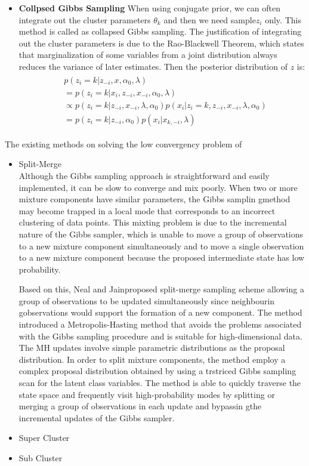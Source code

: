 \begin{itemize}
\begin{eqnarray}
\begin{split}
		 \end{split}
	 \end{eqnarray}
	 \item \textbf{Collpsed Gibbs Sampling}
	 When using conjugate prior, we can often integrate out the cluster parameters $\theta_k$ and then we need sample$z_i$ only. This method is called as collapsed Gibbs sampling. The justification of integrating out the cluster parameters is due to the Rao-Blackwell Theorem, which states that marginalization of some variables from a joint distribution always reduces the variance of later estimates. Then the posterior distribution of $z$ is:
	  \begin{eqnarray}
		  \begin{split}
			  &	p(z_i=k|z_{-i},x,\alpha_0,\lambda)  \\
			  & = p(z_i=k|x_i,z_{-i},x_{-i},\alpha_0,\lambda) \\
			  & \propto  p(z_i=k|z_{-i},x_{-i},\lambda,\alpha_0)p(x_i|z_i=k,z_{-i},x_{-i},\lambda,\alpha_0)  \\
			  & =p(z_i=k|z_{-i},\alpha_0)p(x_i|x_{k,-i},\lambda) 
		  \end{split}
	  \end{eqnarray}
	 \end{itemize}
	 The existing methods on solving the low convergency problem of 
	 \begin{itemize}
	 	\item Split-Merge \\
	 	Although the Gibbs sampling approach is straightforward and easily implemented, it can be slow to converge and mix poorly. When two or more mixture components have similar parameters, the Gibbs samplin gmethod may become trapped in a local mode that corresponds to an incorrect clustering of data points. This mixting problem is due to the incremental nature of the Gibbs sampler, which is unable to move a group of observations to a new mixture component simultaneously and to move a single observation to a new mixture component because the proposed intermediate state has low probability. 
	 	
	 	Based on this, Neal and Jain\cite{jain2004split}proposed split-merge sampling scheme allowing a group of observations to be updated simultaneously since neighbourin gobservations would support the formation of a new component. The method introduced a Metropolis-Hasting method that avoids the problems associated with the Gibbs sampling procedure and is suitable for high-dimensional data. The MH updates involve simple parametric distributions as the proposal distribution. In order to split mixture components, the method employ a complex proposal distribution obtained by using a trstriced Gibbs sampling scan for the latent class variables. The method is able to quickly traverse the state space and frequently visit high-probability modes by splitting or merging a group of observations in each update and bypassin gthe incremental updates of the Gibbs sampler.
	 	\item Super Cluster
	 	\item Sub Cluster
	 \end{itemize}
	 	 
